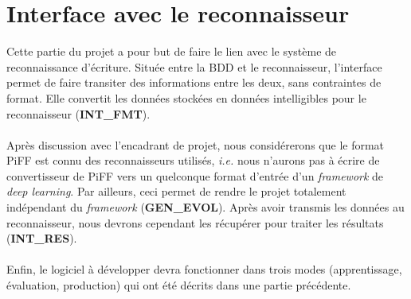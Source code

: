 \section{Interface avec le reconnaisseur}

Cette partie du projet a pour but de faire le lien avec le système de
reconnaissance d’écriture. Située entre la BDD et le reconnaisseur,
l’interface permet de faire transiter des informations entre les deux, sans
contraintes de format. Elle convertit les données stockées en données
intelligibles pour le reconnaisseur (\textbf{INT\_FMT}).

\paragraph{}
Après discussion avec l'encadrant de projet, nous considérerons que le format
PiFF est connu des reconnaisseurs utilisés, \textit{i.e.} nous n'aurons pas à
écrire de convertisseur de PiFF vers un quelconque format d'entrée d'un
\textit{framework} de \textit{deep learning}. Par ailleurs, ceci permet de
rendre le projet totalement indépendant du \textit{framework}
(\textbf{GEN\_EVOL}). Après avoir transmis les données au reconnaisseur, nous
devrons cependant les récupérer pour traiter les résultats (\textbf{INT\_RES}).

\paragraph{}
Enfin, le logiciel à développer devra fonctionner dans trois modes
(apprentissage, évaluation, production) qui ont été décrits dans une partie
précédente.